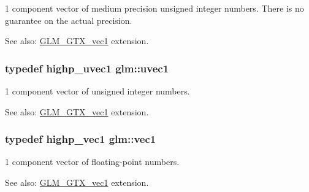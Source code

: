 1 component vector of medium precision unsigned integer numbers. There is no guarantee on the actual precision. \begin{Desc}
\item[See also:]\hyperlink{group__gtx__vec1}{GLM\_\-GTX\_\-vec1} extension. \end{Desc}
\hypertarget{namespaceglm_4e12bc23a3d060164eef452f81d92a03}{
\subsubsection[uvec1]{\setlength{\rightskip}{0pt plus 5cm}typedef {\bf highp\_\-uvec1} {\bf glm::uvec1}}}
\label{namespaceglm_4e12bc23a3d060164eef452f81d92a03}


1 component vector of unsigned integer numbers. \begin{Desc}
\item[See also:]\hyperlink{group__gtx__vec1}{GLM\_\-GTX\_\-vec1} extension. \end{Desc}
\hypertarget{namespaceglm_16030dae9029ed1eab1553a2183bbb79}{
\subsubsection[vec1]{\setlength{\rightskip}{0pt plus 5cm}typedef {\bf highp\_\-vec1} {\bf glm::vec1}}}
\label{namespaceglm_16030dae9029ed1eab1553a2183bbb79}


1 component vector of floating-point numbers. \begin{Desc}
\item[See also:]\hyperlink{group__gtx__vec1}{GLM\_\-GTX\_\-vec1} extension. \end{Desc}
